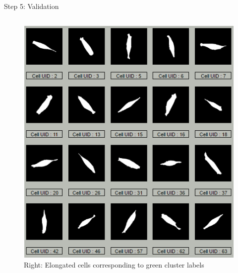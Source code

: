 \documentclass[final,hyperref={pdfpagelabels=false}]{beamer}
\begin{document}
\begin{frame}[t]
\begin{columns}[t]
\begin{column}{.465\textwidth}
\begin{block}{Step 5: Validation}
\begin{columns}
\begin{column}{.48\textwidth}
\centering
\begin{figure}
\includegraphics[width=0.99\linewidth]{cluster_fig2.png}
\captionsetup{justification=raggedright,singlelinecheck=false,labelformat=empty}
\caption{Right: Elongated cells corresponding to green cluster labels}
\end{figure}
\end{column}

\end{columns}

\vspace{0.5em}

\begin{columns}


\end{columns}
\end{block}
\end{column}
\end{columns}
\end{frame}
\end{document}
